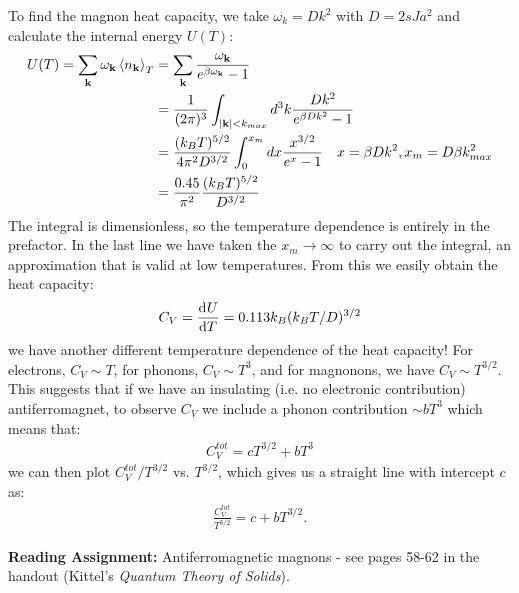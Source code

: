 To find the magnon heat capacity, we take $\omega_k = Dk^2$ with $D = 2sJa^2$ and calculate the internal energy $U(T)$:
\begin{equation}
    \begin{split}
        U(T) = \sum_{\mathbf{k}}\omega_{\mathbf{k}}\left< n_{\mathbf{k}} \right>_T &= \sum_{\mathbf{k}}\frac{\omega_{\mathbf{k}}}{e^{\beta\omega_{\mathbf{k}}} - 1}
        \\ &= \frac{1}{(2\pi)^3}\int_{\lvert \mathbf{k} \rvert < k_{max}} d^3k \frac{Dk^2}{e^{\beta Dk^2} - 1}
        \\ &= \frac{(k_B T)^{5/2}}{4\pi^2 D^{3/2}}\int_0^{x_m}dx \frac{x^{3/2}}{e^x - 1} \quad x = \beta Dk^2, x_m = D\beta k^2_{max}
        \\ &= \frac{0.45}{\pi^2}\frac{(k_B T)^{5/2}}{D^{3/2}}
    \end{split}
\end{equation}
The integral is dimensionless, so the temperature dependence is entirely in the prefactor. In the last line we have taken the $x_m \to \infty$ to carry out the integral, an approximation that is valid at low temperatures. From this we easily obtain the heat capacity:
\begin{equation}
    C_V = \dod{U}{T} = 0.113k_B(k_B T/D)^{3/2}
\end{equation}
we have another different temperature dependence of the heat capacity! For electrons, $C_V \sim T$, for phonons, $C_V \sim T^3$, and for magnonons, we have $C_V \sim T^{3/2}$. This suggests that if we have an insulating (i.e. no electronic contribution) antiferromagnet, to observe $C_V$ we include a phonon contribution $\sim bT^3$ which means that:
\begin{align*}
    C_V^{tot} = cT^{3/2} + bT^3
\end{align*}
we can then plot $C_V^{tot}/T^{3/2}$ vs. $T^{3/2}$, which gives us a straight line with intercept $c$ as:
\begin{align*}
    \frac{C_V^{tot}}{T^{3/2}} = c + bT^{3/2}.
\end{align*}

\textbf{Reading Assignment:} Antiferromagnetic magnons - see pages 58-62 in the handout (Kittel's \emph{Quantum Theory of Solids}).

